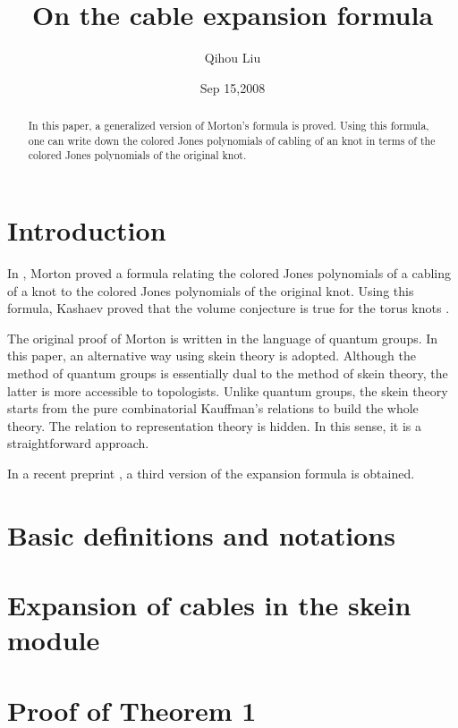 \documentclass[10pt]{amsart}
\begin{document}
\title[Cable expansion]
{On the cable expansion formula}
\author{Qihou Liu}

\date{Sep 15,2008}
\maketitle

\begin{abstract}
 In this paper, a generalized version of Morton's formula \cite{MO} is proved. Using this formula, one can write down the colored Jones polynomials of cabling of an knot in terms of the colored Jones polynomials of the original knot.
\end{abstract}

\section{Introduction}\label{intro}
In \cite{MO}, Morton proved a formula relating the colored Jones polynomials of a cabling of a knot to the colored Jones polynomials of the original knot. Using this formula, Kashaev proved that the volume conjecture is true for the torus knots \cite{KT}.

The original proof of Morton is written in the language of quantum groups. In this paper, an alternative way using skein theory is adopted. Although the method of quantum groups is essentially dual to the method of skein theory, the latter is more accessible to topologists. Unlike quantum groups, the skein theory starts from the pure combinatorial Kauffman's relations to build the whole theory. The relation to representation theory is hidden. In this sense, it is a straightforward approach.

In a recent preprint \cite{VV}, a third version of the expansion formula is obtained.

\section{Basic definitions and notations}\label{def}


\section{Expansion of cables in the skein module}\label{thm}


\section{Proof of Theorem 1}\label{proof}

\end{document}
